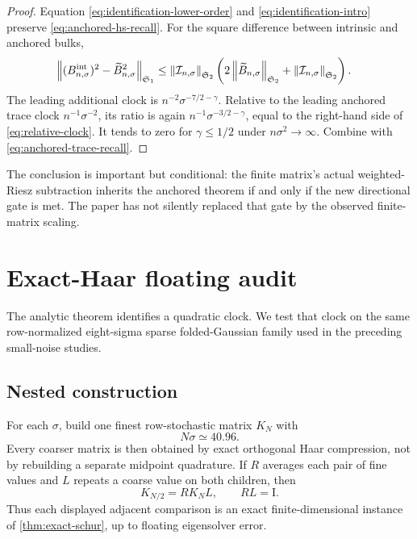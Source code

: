 \documentclass[11pt]{article}
\theoremstyle{definition}
\theoremstyle{remark}
\newcommand{\Id}{\mathrm I}
\newcommand{\cI}{\mathcal I}
\newcommand{\HS}{\mathfrak S_2}
\newcommand{\TC}{\mathfrak S_1}
\newcommand{\norm}[1]{\left\lVert #1\right\rVert}
\begin{document}
\begin{proof}
Equation \eqref{eq:identification-lower-order} and
\eqref{eq:identification-intro} preserve
\eqref{eq:anchored-hs-recall}.  For the square difference between intrinsic
and anchored bulks,
\begin{align}
 \norm{(B_{n,\sigma}^{\rm int})^2
       -\widetilde B_{n,\sigma}^2}_{\TC}
 &\le
 \norm{\cI_{n,\sigma}}_{\HS}
 \left(2\norm{\widetilde B_{n,\sigma}}_{\HS}
       +\norm{\cI_{n,\sigma}}_{\HS}\right).
 \label{eq:intrinsic-square-difference}
\end{align}
The leading additional clock is
$n^{-2}\sigma^{-7/2-\gamma}$.  Relative to the leading anchored trace clock
$n^{-1}\sigma^{-2}$, its ratio is again
$n^{-1}\sigma^{-3/2-\gamma}$, equal to the right-hand side of
\eqref{eq:relative-clock}.  It tends to zero for $\gamma\le1/2$ under
$n\sigma^2\to\infty$.  Combine with
\eqref{eq:anchored-trace-recall}.
\end{proof}

The conclusion is important but conditional: the finite matrix's actual
weighted-Riesz subtraction inherits the anchored theorem if and only if the
new directional gate is met.  The paper has not silently replaced that gate
by the observed finite-matrix scaling.

\section{Exact-Haar floating audit}
\label{sec:numerics}

The analytic theorem identifies a quadratic clock.  We test that clock on
the same row-normalized eight-sigma sparse folded-Gaussian family used in
the preceding small-noise studies.

\subsection{Nested construction}

For each $\sigma$, build one finest row-stochastic matrix $K_N$ with
\begin{equation}
 N\sigma\simeq40.96.
 \label{eq:finest-resolution}
\end{equation}
Every coarser matrix is then obtained by exact orthogonal Haar compression,
not by rebuilding a separate midpoint quadrature.  If $R$ averages each
pair of fine values and $L$ repeats a coarse value on both children, then
\begin{equation}
 K_{N/2}=RK_NL,
 \qquad RL=\Id.
 \label{eq:exact-haar-compression}
\end{equation}
Thus each displayed adjacent comparison is an exact finite-dimensional
instance of \cref{thm:exact-schur}, up to floating eigensolver error.
\end{document}
